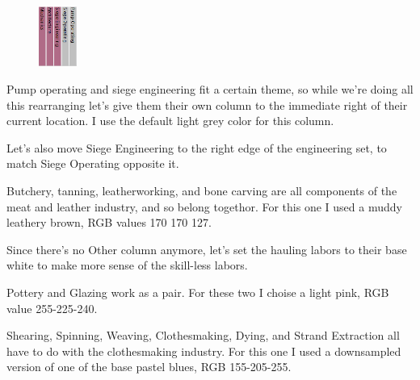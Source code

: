 \documentclass[]{article}
\begin{document}
\begin{figure}
\vspace{-25pt}
  \begin{center}
    \includegraphics[width=0.11\textwidth]{Sec3Fig21}
  \end{center}
\vspace{-15pt}
\end{figure}
Pump operating and siege engineering fit a certain theme, so while we're doing all this rearranging let's
give them their own column to the immediate right of their current location. I use the default light grey
color for this column.
\vspace{12pt}

Let's also move Siege Engineering to the right edge of the engineering set, to match Siege Operating
opposite it.
\vspace{12pt}

Butchery, tanning, leatherworking, and bone carving are all components of the meat and leather industry,
and so belong togethor. For this one I used a muddy leathery brown, RGB values 170 170 127.
\vspace{12pt}

Since there's no Other column anymore, let's set the hauling labors to their base white to make more
sense of the skill-less labors.
\vspace{12pt}

Pottery and Glazing work as a pair. For these two I choise a light pink, RGB value 255-225-240.
\vspace{12pt}

Shearing, Spinning, Weaving, Clothesmaking, Dying, and Strand Extraction all have to do with the
clothesmaking industry. For this one I used a downsampled version of one of the base pastel blues, RGB
155-205-255.
\vspace{12pt}
\end{document}
